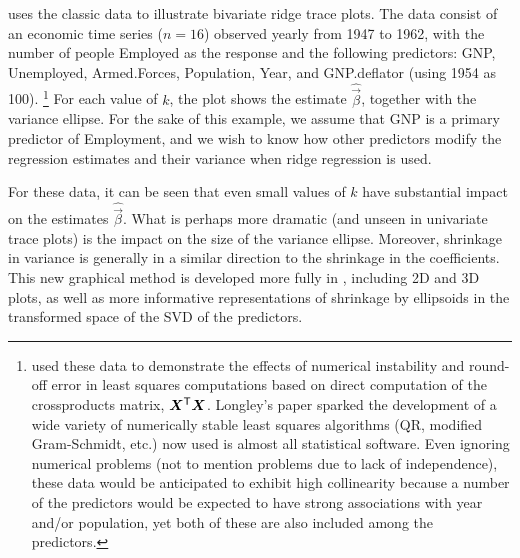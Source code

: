  uses the classic \citet{Longley:1967}
data to illustrate
bivariate ridge trace plots.  The data consist of an economic time series ($n=16$)
observed yearly from 1947 to 1962, with the number of people Employed as the
response and the following predictors:
GNP, Unemployed,  Armed.Forces,  Population,  Year, and GNP.deflator (using
1954 as 100).%
\footnote{
\citet{Longley:1967} used these data to demonstrate the effects of
numerical instability and round-off error in least squares computations
based on direct computation of the crossproducts matrix, $\bm{X}^\mathsf{T}\bm{X}$.
Longley's paper sparked the development of a wide variety of
numerically stable least squares algorithms (QR, modified Gram-Schmidt, etc.)
now used is almost all statistical software.
Even ignoring numerical problems
(not to mention problems due to lack of independence), these
data would be anticipated to exhibit high collinearity because
a number of the predictors would be expected to have strong associations
with year and/or population, yet both of these are also included among the
predictors.
}
For each value of $k$, the plot
shows the estimate $\widehat{\vec{\beta}}$, together with the variance
ellipse.  For the sake of this example, we assume that GNP is a primary
predictor of Employment, and we wish to know how other predictors modify the
regression estimates and their variance when ridge regression is used.

For these data, it can be seen that even small values of $k$ have substantial
impact on the estimates $\widehat{\vec{\beta}}$. What is perhaps more dramatic
(and unseen in univariate trace plots) is the impact on the size of the variance
ellipse.  Moreover, shrinkage in variance is generally in a similar direction to the
shrinkage in the coefficients. This new graphical method is developed more fully in 
\citet{Friendly:genridge:2012},
including 2D and 3D plots, as well as more informative representations of shrinkage by ellipsoids in 
the transformed space of the SVD of the predictors.
